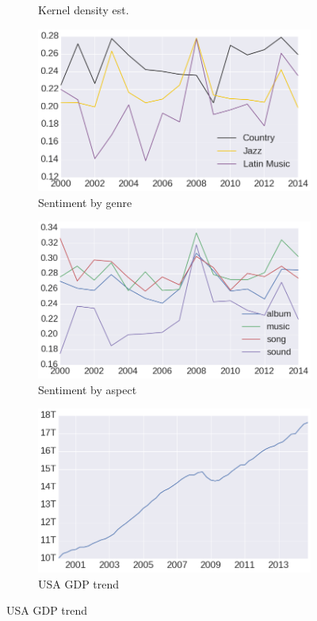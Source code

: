 \begin{figure}[ht!]
\begin{subfigure}{.32\textwidth}
        \caption{Kernel density est.}
        \label{fig:musicology:kde}
    \end{subfigure}
    \begin{subfigure}{.32\textwidth}
        \centering
        \includegraphics[width=.9\linewidth]{ch05_musicology_pics/genres_average.png}
        \caption{Sentiment by genre}
        \label{fig:musicology:avgSentReviewGenres}
    \end{subfigure}
    \begin{subfigure}{.32\textwidth}
        \centering
        \includegraphics[width=.9\linewidth]{ch05_musicology_pics/main_aspects.png}
        \caption{Sentiment by aspect}
        \label{fig:musicology:avgSentReviewAspects}
    \end{subfigure}
    \begin{subfigure}{.32\textwidth}
        \centering
        \includegraphics[width=.8\linewidth]{ch05_musicology_pics/gdp2.png}
        \caption{USA GDP trend}
        \label{fig:musicology:gdp}
    \end{subfigure}
 

\end{figure}
